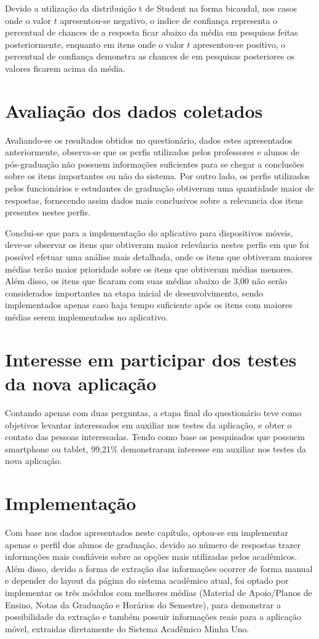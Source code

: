 Devido a utilização da  distribuição t de Student na forma bicaudal, nos casos onde o valor $t$ apresentou-se negativo, o indice de confiança representa o percentual de chances de a resposta ficar abaixo da média em pesquisas feitas posteriormente, enquanto em itens onde o valor $t$ apresentou-se positivo, o percentual de confiança demonstra as chances de em pesquisas posteriores os valores ficarem acima da média.

\section{Avaliação dos dados coletados}
Avaliando-se os resultados obtidos no questionário, dados estes apresentados anteriormente, observa-se que os perfis utilizados pelos professores e alunos de pós-graduação não possuem informações suficientes para se chegar a conclusões sobre os itens importantes ou não do sistema.
Por outro lado, os perfis utilizados pelos funcionários e estudantes de graduação obtiveram uma quantidade maior de respostas, fornecendo assim dados mais conclusivos sobre a relevancia dos itens presentes nestes perfis.

Conclui-se que para a implementação do aplicativo para dispositivos móveis, deve-se observar os itens que obtiveram maior relevância nestes perfis em que foi possível efetuar uma análise mais detalhada, onde os itens que obtiveram maiores médias terão maior prioridade sobre os itens que obtiveram médias menores. Além disso, os itens que ficaram com suas médias abaixo de 3,00 não serão considerados importantes na etapa inicial de desenvolvimento, sendo implementados apenas caso haja tempo suficiente após os itens com maiores médias serem implementados no aplicativo.

\section{Interesse em participar dos testes da nova aplicação}
Contando apenas com duas perguntas, a etapa final do questionário teve como objetivos levantar interessados em auxiliar nos testes da aplicação, e obter o contato das pessoas interessadas. Tendo como base os pesquisados que possuem smartphone ou tablet, 99,21\% demonstraram interesse em auxiliar nos testes da nova aplicação.

\section{Implementação}
Com base nos dados apresentados neste capítulo, optou-se em implementar apenas o perfil dos alunos de graduação, devido ao número de respostas trazer informações mais confiáveis sobre as opções mais utilizadas pelos acadêmicos. Além disso, devido a forma de extração das informações ocorrer de forma manual e depender do layout da página do sistema acadêmico atual, foi optado por implementar os três módulos com melhores médias (Material de Apoio/Planos de Ensino, Notas da Graduação e Horários do Semestre), para demonstrar a possibilidade da extração e também possuir informações reais para a aplicação móvel, extraidas diretamente do Sistema Acadêmico Minha Uno.

